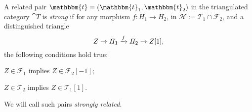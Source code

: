 \begin{nonlisting_def}[\ref{def:strongly_related}]
  A related pair $\mathbbm{t}=(\mathbbm{t}_1,\mathbbm{t}_2)$ in the triangulated category
  $\cat{T}$ is \emph{strong} if for any morphism $f:H_1\to H_2$, in $\mathcal{H}:=\mathcal{T}_1\cap\mathcal{F}_2$,
  and a distinguished triangle \[ Z\to H_1\xrightarrow{f}H_2\to Z[1],\] the following conditions
  hold true:
  \begin{relatedtorsion}
  \item $Z\in\mathcal{F}_1$ implies $Z\in\mathcal{F}_2[-1]$;
  \item $Z\in\mathcal{T}_2$ implies $Z\in\mathcal{T}_1[1]$.
  \end{relatedtorsion}

  We will call such pairs \emph{strongly related}.
\end{nonlisting_def}




